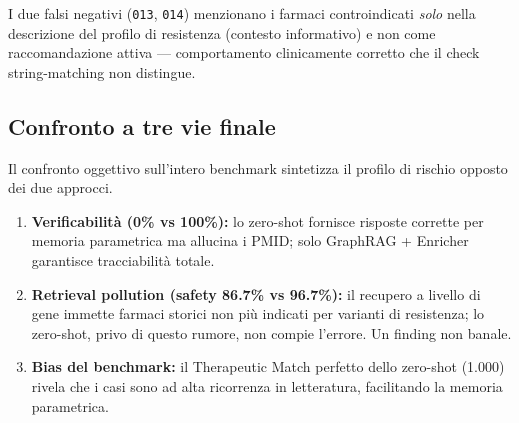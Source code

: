 \documentclass[11pt,a4paper]{article}
\newcommand{\bench}[1]{\texttt{\small #1}}
\begin{document}
\begin{tesibox}
I due falsi negativi (\bench{013}, \bench{014}) menzionano i farmaci controindicati \emph{solo} nella descrizione del profilo di resistenza (contesto informativo) e non come raccomandazione attiva --- comportamento clinicamente corretto che il check string-matching non distingue.
\end{tesibox}

\subsection{Confronto a tre vie finale}
Il confronto oggettivo sull'intero benchmark sintetizza il profilo di rischio opposto dei due approcci.

\begin{center}
\end{center}

\begin{insightbox}
\begin{enumerate}[leftmargin=1.4em]
\item \textbf{Verificabilit\`a (0\% vs 100\%):} lo zero-shot fornisce risposte corrette per memoria parametrica ma allucina i PMID; solo GraphRAG + Enricher garantisce tracciabilit\`a totale.
\item \textbf{Retrieval pollution (safety 86.7\% vs 96.7\%):} il recupero a livello di gene immette farmaci storici non pi\`u indicati per varianti di resistenza; lo zero-shot, privo di questo rumore, non compie l'errore. Un finding non banale.
\item \textbf{Bias del benchmark:} il Therapeutic Match perfetto dello zero-shot (1.000) rivela che i casi sono ad alta ricorrenza in letteratura, facilitando la memoria parametrica.
\end{enumerate}
\end{insightbox}
\end{document}
